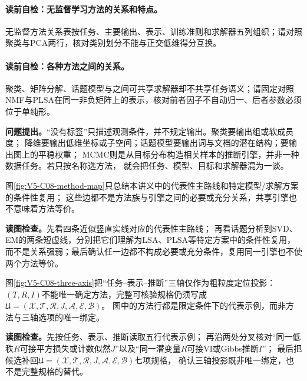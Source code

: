 \paragraph{读前自检：无监督学习方法的关系和特点。}无监督方法关系表按任务、主要输出、表示、训练准则和求解器五列组织；请对照聚类与PCA两行，核对类别划分不能与正交低维得分互换。\par
\paragraph{读前自检：各种方法之间的关系。}聚类、矩阵分解、话题模型与\PageRank{}之间可共享求解器却不共享任务语义；请固定对照NMF与PLSA在同一非负矩阵上的表示，核对前者因子不自动归一、后者参数必须位于单纯形。\par


\label{struct:V5-C08-CH06}
\textbf{问题提出。}“没有标签”只描述观测条件，并不规定输出。聚类要输出组或软成员度；
降维要输出低维坐标或子空间；话题模型要输出词与文档的潜在结构；\PageRank{}要输出图上的平稳权重；
MCMC则是从目标分布构造相关样本的推断引擎，并非一种数据任务。若只按名称选方法，
就会把任务、模型、目标和求解器混为一谈。

图\ref{fig:V5-C08-method-map}只总结本讲义中的代表性主路线和特定模型/求解方案的条件性复用；
这些边都不是方法族与引擎之间的必要或充分关系，共享引擎也不意味着方法等价。

\FloatBarrier
\noindent\textbf{读图检查。}先看四条近似竖直实线对应的代表性主路线；
再看话题分析到SVD、EM的两条短虚线，分别把它们理解为LSA、PLSA等特定方案中的条件性复用，
而不是关系强弱；最后确认任一边都不构成必要或充分条件，复用同一引擎也不使两个方法等价。

图\ref{fig:V5-C08-three-axis}把“任务--表示--推断”三轴仅作为粗粒度定位投影：
$(T,R,I)$不能唯一确定方法，完整可核验规格仍须写成
$\mathfrak U=(\mathcal X,\mathcal T,\mathcal R,J,\mathcal A,\mathcal E,\mathcal B)$。
图中的方法行都是限定条件下的代表示例，而非方法与三轴选项的唯一绑定。

\FloatBarrier
\noindent\textbf{读图检查。}先按任务、表示、推断读取五行代表示例；
再沿两处分叉核对“同一低秩$R$可接平方损失或计数似然$J$”以及“同一潜变量$R$可接VI或Gibbs推断$I$”；
最后把候选补回$\mathfrak U=(\mathcal X,\mathcal T,\mathcal R,J,\mathcal A,\mathcal E,\mathcal B)$七项规格，
确认三轴投影既非唯一绑定，也不是完整规格的替代。

